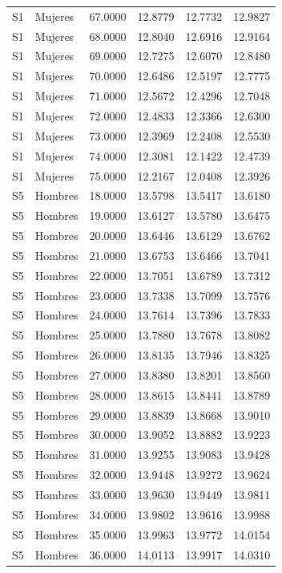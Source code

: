\begin{longtable}{llrrrr}
S1 & Mujeres & 67.0000 & 12.8779 & 12.7732 & 12.9827 \\
S1 & Mujeres & 68.0000 & 12.8040 & 12.6916 & 12.9164 \\
S1 & Mujeres & 69.0000 & 12.7275 & 12.6070 & 12.8480 \\
S1 & Mujeres & 70.0000 & 12.6486 & 12.5197 & 12.7775 \\
S1 & Mujeres & 71.0000 & 12.5672 & 12.4296 & 12.7048 \\
S1 & Mujeres & 72.0000 & 12.4833 & 12.3366 & 12.6300 \\
S1 & Mujeres & 73.0000 & 12.3969 & 12.2408 & 12.5530 \\
S1 & Mujeres & 74.0000 & 12.3081 & 12.1422 & 12.4739 \\
S1 & Mujeres & 75.0000 & 12.2167 & 12.0408 & 12.3926 \\
S5 & Hombres & 18.0000 & 13.5798 & 13.5417 & 13.6180 \\
S5 & Hombres & 19.0000 & 13.6127 & 13.5780 & 13.6475 \\
S5 & Hombres & 20.0000 & 13.6446 & 13.6129 & 13.6762 \\
S5 & Hombres & 21.0000 & 13.6753 & 13.6466 & 13.7041 \\
S5 & Hombres & 22.0000 & 13.7051 & 13.6789 & 13.7312 \\
S5 & Hombres & 23.0000 & 13.7338 & 13.7099 & 13.7576 \\
S5 & Hombres & 24.0000 & 13.7614 & 13.7396 & 13.7833 \\
S5 & Hombres & 25.0000 & 13.7880 & 13.7678 & 13.8082 \\
S5 & Hombres & 26.0000 & 13.8135 & 13.7946 & 13.8325 \\
S5 & Hombres & 27.0000 & 13.8380 & 13.8201 & 13.8560 \\
S5 & Hombres & 28.0000 & 13.8615 & 13.8441 & 13.8789 \\
S5 & Hombres & 29.0000 & 13.8839 & 13.8668 & 13.9010 \\
S5 & Hombres & 30.0000 & 13.9052 & 13.8882 & 13.9223 \\
S5 & Hombres & 31.0000 & 13.9255 & 13.9083 & 13.9428 \\
S5 & Hombres & 32.0000 & 13.9448 & 13.9272 & 13.9624 \\
S5 & Hombres & 33.0000 & 13.9630 & 13.9449 & 13.9811 \\
S5 & Hombres & 34.0000 & 13.9802 & 13.9616 & 13.9988 \\
S5 & Hombres & 35.0000 & 13.9963 & 13.9772 & 14.0154 \\
S5 & Hombres & 36.0000 & 14.0113 & 13.9917 & 14.0310 \\

\end{longtable}
